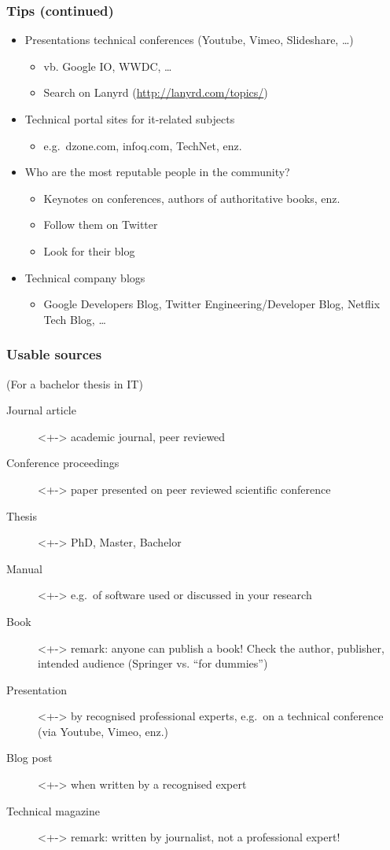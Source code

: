 \documentclass{beamer}
\begin{document}
\begin{frame}
  \frametitle{Tips (continued)}

  \begin{itemize}
    \item Presentations technical conferences (Youtube, Vimeo, Slideshare, \dots)
      \begin{itemize}
        \item vb. Google IO, WWDC, \dots
        \item Search on Lanyrd (\url{http://lanyrd.com/topics/})
      \end{itemize}
    \item<+-> Technical portal sites for it-related subjects
      \begin{itemize}
        \item e.g.~dzone.com, infoq.com, TechNet, enz.
      \end{itemize}
    \item<+-> Who are the most reputable people in the community?
      \begin{itemize}
        \item Keynotes on conferences, authors of authoritative books, enz.
        \item Follow them on Twitter
        \item Look for their blog
      \end{itemize}
    \item<+-> Technical company blogs
      \begin{itemize}
        \item Google Developers Blog, Twitter Engineering/Developer Blog, Netflix Tech Blog, \dots
      \end{itemize}
  \end{itemize}
\end{frame}


\begin{frame}
  \frametitle{Usable sources}

  (For a bachelor thesis in IT)

  \begin{description}
    \item[Journal article]<+-> academic journal, peer reviewed
    \item[Conference proceedings]<+-> paper presented on peer reviewed scientific conference
    \item[Thesis]<+-> PhD, Master, Bachelor
    \item[Manual]<+-> e.g.~of software used or discussed in your research
    \item[Book]<+-> remark: anyone can publish a book! Check the author, publisher, intended audience (Springer vs. ``for dummies'')
    \item[Presentation]<+-> by recognised professional experts, e.g.~on a technical conference (via Youtube, Vimeo, enz.)
    \item[Blog post]<+-> when written by a recognised expert
    \item[Technical magazine]<+-> remark: written by journalist, not a professional expert!
  \end{description}
\end{frame}
\end{document}
